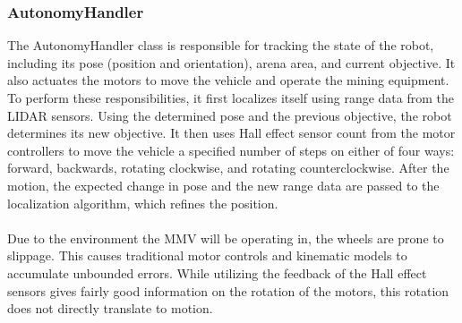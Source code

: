 \subsubsection{AutonomyHandler}
The AutonomyHandler class is responsible for tracking the state of the robot, including its pose (position and orientation), arena area, and current objective.  It also actuates the motors to move the vehicle and operate the mining equipment.  To perform these responsibilities, it first localizes itself using range data from the LIDAR sensors.  Using the determined pose and the previous objective, the robot determines its new objective.  It then uses Hall effect sensor count from the motor controllers to move the vehicle a specified number of steps on either of four ways: forward, backwards, rotating clockwise, and rotating counterclockwise.  After the motion, the expected change in pose and the new range data are passed to the localization algorithm, which refines the position.\\\\
Due to the environment the MMV will be operating in, the wheels are prone to slippage.  This causes traditional motor controls and kinematic models to accumulate unbounded errors.  While utilizing the feedback of the Hall effect sensors gives fairly good information on the rotation of the motors, this rotation does not directly translate to motion.
